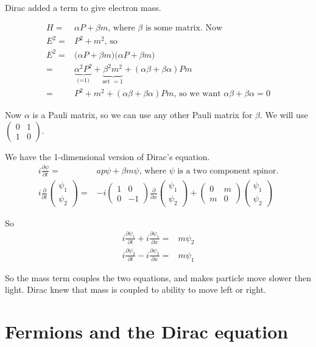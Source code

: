 \documentclass[]{article}
\begin{document}
Dirac added a term to give electron mass.

\begin{align*}
H =& \alpha P + \beta m \text{, where $\beta$ is some matrix. Now}\\
E^2 =& P^2 + m^2 \text{, so}\\
E^2 =& \big(\alpha P + \beta m \big) \big(\alpha P + \beta m \big)\\
=& \underbrace{\alpha^2 P^2}_\text{(=1)} + \underbrace{\beta^2 m^2}_\text{set  $=1$} + (\alpha \beta + \beta \alpha) P m\\
=&  P^2 + m^2 + (\alpha \beta + \beta \alpha) P m \text{, so we want $\alpha \beta + \beta \alpha=0$}
\end{align*}

Now $\alpha$ is a Pauli matrix, so we can use any other Pauli matrix for $\beta$. We will use
$
\begin{pmatrix}
0&1\\
1&0
\end {pmatrix}
$.

We have the 1-dimensional version of Dirac's equation.
\begin{align*}
i \frac{\partial \psi}{\partial t}=& a p \psi + \beta m \psi \text{, where $\psi$ is a two component spinor.}\\
i \frac{\partial}{\partial t}\begin{pmatrix}
\psi_1\\
\psi_2
\end{pmatrix}=&-i \begin{pmatrix}
1&0\\
0&-1
\end{pmatrix} \frac{\partial}{\partial x}\begin{pmatrix}
\psi_1\\
\psi_2
\end{pmatrix} + \begin{pmatrix}
0&m\\
m&0
\end{pmatrix}\begin{pmatrix}
\psi_1\\
\psi_2
\end{pmatrix}
\end{align*}

So
\begin{align*}
i\frac{\partial \psi_1}{\partial t} + i\frac{\partial \psi_1}{\partial x}=&m \psi_2\\
i\frac{\partial \psi_2}{\partial t} - i\frac{\partial \psi_2}{\partial x}=&m \psi_1
\end{align*}

So the mass term couples the two equations, and makes particle move slower then light. Dirac knew that mass is coupled to ability to move left or right.

\section{Fermions and the Dirac equation}
\end{document}
